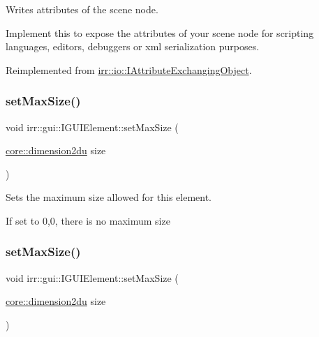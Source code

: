 Writes attributes of the scene node. 

Implement this to expose the attributes of your scene node for scripting languages, editors, debuggers or xml serialization purposes. 

Reimplemented from \hyperlink{classirr_1_1io_1_1IAttributeExchangingObject_a587f7b633366968f0488e1099e9172ef}{irr\+::io\+::\+I\+Attribute\+Exchanging\+Object}.

\mbox{\label{classirr_1_1gui_1_1IGUIElement_ae80ad7253fb9fb2ebbeda2a8148fff3e}} 
\subsubsection{\texorpdfstring{set\+Max\+Size()}{setMaxSize()}\hspace{0.1cm}{\footnotesize\ttfamily [1/2]}}
{\footnotesize\ttfamily void irr\+::gui\+::\+I\+G\+U\+I\+Element\+::set\+Max\+Size (\begin{DoxyParamCaption}\item[{\hyperlink{namespaceirr_1_1core_a13e5bd7e47b2014eefc870ede11bbbbc}{core\+::dimension2du}}]{size }\end{DoxyParamCaption})\hspace{0.3cm}{\ttfamily [inline]}}



Sets the maximum size allowed for this element. 

If set to 0,0, there is no maximum size \mbox{\label{classirr_1_1gui_1_1IGUIElement_ae80ad7253fb9fb2ebbeda2a8148fff3e}} 
\subsubsection{\texorpdfstring{set\+Max\+Size()}{setMaxSize()}\hspace{0.1cm}{\footnotesize\ttfamily [2/2]}}
{\footnotesize\ttfamily void irr\+::gui\+::\+I\+G\+U\+I\+Element\+::set\+Max\+Size (\begin{DoxyParamCaption}\item[{\hyperlink{namespaceirr_1_1core_a13e5bd7e47b2014eefc870ede11bbbbc}{core\+::dimension2du}}]{size }\end{DoxyParamCaption})\hspace{0.3cm}{\ttfamily [inline]}}




